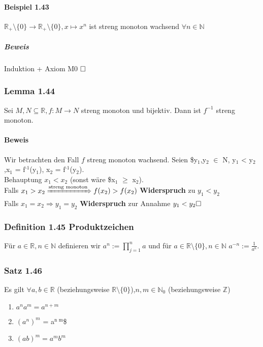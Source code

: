 \documentclass[a4paper]{scrartcl}
\DeclareMathOperator{\Forall}{\forall}%
\begin{document}
\paragraph{Beispiel 1.43}
\label{sec-2-9-10-1}
$\mathbb{R}_+\setminus \{0\} \to \mathbb{R}_+\setminus\{0\}, x\mapsto x^n$ ist streng monoton wachsend $\Forall n\in\mathbb{N}$
\subparagraph{Beweis}
\label{sec-2-9-10-1-1}
Induktion + Axiom M0 $\hfill\square$
\subsubsection{Lemma 1.44}
\label{sec-2-9-11}
Sei $M,N \subseteq \mathbb{R}, f:M\to N$ streng monoton und bijektiv. Dann ist $f^{-1}$ streng monoton.
\paragraph{Beweis}
\label{sec-2-9-11-1}
Wir betrachten den Fall $f$ streng monoton wachsend. Seien \$y$_{\text{1}}$,y$_{\text{2}}$ $\in$ N, y$_{\text{1}}$ < y$_{\text{2}}$,x$_{\text{1}}$ = f$^{\text{-1}}$(y$_{\text{1}}$), x$_{\text{2}}$ = f$^{\text{-1}}$(y$_{\text{2}}$). \\
     Behauptung $x_1 < x_2$ (sonst wäre \$x$_{\text{1}}$ $\ge$ x$_{\text{2}}$). \\
     Falls $x_1 > x_2 \xRightarrow{\text{streng monoton}} f(x_2) > f(x_2)$ \textbf{Widerspruch} zu $y_1 < y_2$ \\
     Falls $x_1 = x_2 \Rightarrow y_1 = y_2$ \textbf{Widerspruch} zur Annahme $y_1 < y_2 \hfill \square$
\subsubsection{Definition 1.45 Produktzeichen}
\label{sec-2-9-12}
Für $a\in\mathbb{R},n\in\mathbb{N}$ definieren wir $a^n := \prod_{j=1}^n a$ und für $a\in\mathbb{R}\setminus\{0\},n\in\mathbb{N}$ $a^{-n} := \frac{1}{a^n}$.
\subsubsection{Satz 1.46}
\label{sec-2-9-13}
Es gilt $\Forall a,b\in\mathbb{R}$ (beziehungsweise $\mathbb{R}\setminus \{0\}$),$n,m\in\mathbb{N}_0$ (beziehungsweise $\mathbb{Z}$)
\begin{enumerate}
\item $a^n a^m = a^{n+m}$
\item $(a^n)^m$ = a$^{\text{n m}}$\$
\item $(ab)^m = a^m b^m$
\end{enumerate}
\end{document}

